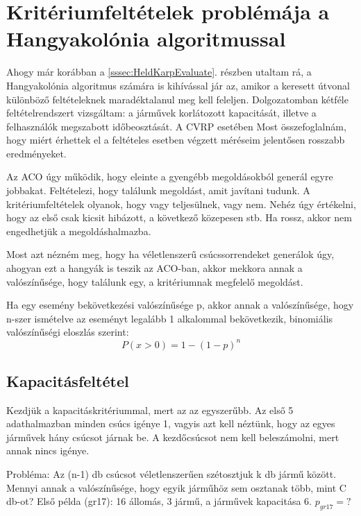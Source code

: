 \section{Kritériumfeltételek problémája a Hangyakolónia algoritmussal}
\label{section:conditionsWithACO}
Ahogy már korábban a \ref{sssec:HeldKarpEvaluate}. részben utaltam rá, a Hangyakolónia algoritmus számára is kihívással jár az, amikor a keresett útvonal különböző feltételeknek maradéktalanul meg kell feleljen. Dolgozatomban kétféle feltételrendszert vizsgáltam: a járművek korlátozott kapacitását, illetve a felhasználók megszabott időbeosztását. A CVRP esetében Most összefoglalnám, hogy miért érhettek el a feltételes esetben végzett méréseim jelentősen rosszabb eredményeket.

Az ACO úgy működik, hogy eleinte a gyengébb megoldásokból generál egyre jobbakat. Feltételezi, hogy találunk megoldást, amit javítani tudunk. A kritériumfeltételek olyanok, hogy vagy teljesülnek, vagy nem. Nehéz úgy értékelni, hogy az első csak kicsit hibázott, a következő közepesen stb. Ha rossz, akkor nem engedhetjük a megoldáshalmazba.

Most azt nézném meg, hogy ha véletlenszerű csúcssorrendeket generálok úgy, ahogyan ezt a hangyák is teszik az ACO-ban, akkor mekkora annak a valószínűsége, hogy találunk egy, a kritériumnak megfelelő megoldást.

Ha egy esemény bekövetkezési valószínűsége p, akkor annak a valószínűsége, hogy n-szer ismételve az eseményt legalább 1 alkalommal bekövetkezik, binomiális valószínűségi eloszlás szerint:
\begin{equation}
	P(x>0) = 1-(1-p)^n
	\label{binomial_probability}
\end{equation}

\subsection{Kapacitásfeltétel}
Kezdjük a kapacitáskritériummal, mert az az egyszerűbb. Az első 5 adathalmazban minden csúcs igénye 1, vagyis azt kell néztünk, hogy az egyes járművek hány csúcsot járnak be. A kezdőcsúcsot nem kell beleszámolni, mert annak nincs igénye. 

Probléma: Az (n-1) db csúcsot véletlenszerűen szétosztjuk k db jármű között. Mennyi annak a valószínűsége, hogy egyik járműhöz sem osztanak több, mint C db-ot? Első példa (gr17): 16 állomás, 3 jármű, a járművek kapacitása 6. \(p_{gr17}=?\)

\newcommand{\pgr}{0,258}

